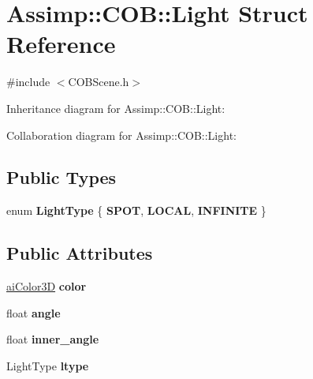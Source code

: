 \hypertarget{struct_assimp_1_1_c_o_b_1_1_light}{\section{Assimp\+:\+:C\+O\+B\+:\+:Light Struct Reference}
\label{struct_assimp_1_1_c_o_b_1_1_light}
}


{\ttfamily \#include $<$C\+O\+B\+Scene.\+h$>$}



Inheritance diagram for Assimp\+:\+:C\+O\+B\+:\+:Light\+:


Collaboration diagram for Assimp\+:\+:C\+O\+B\+:\+:Light\+:
\subsection*{Public Types}
\begin{DoxyCompactItemize}
\item 
\hypertarget{struct_assimp_1_1_c_o_b_1_1_light_a4486549bdc4bb81e6ff5bbef348e2f6e}{enum {\bfseries Light\+Type} \{ {\bfseries S\+P\+O\+T}, 
{\bfseries L\+O\+C\+A\+L}, 
{\bfseries I\+N\+F\+I\+N\+I\+T\+E}
 \}}\label{struct_assimp_1_1_c_o_b_1_1_light_a4486549bdc4bb81e6ff5bbef348e2f6e}

\end{DoxyCompactItemize}
\subsection*{Public Attributes}
\begin{DoxyCompactItemize}
\item 
\hypertarget{struct_assimp_1_1_c_o_b_1_1_light_a341e984619f2dc39d75cb905d27fb1d6}{\hyperlink{structai_color3_d}{ai\+Color3\+D} {\bfseries color}}\label{struct_assimp_1_1_c_o_b_1_1_light_a341e984619f2dc39d75cb905d27fb1d6}

\item 
\hypertarget{struct_assimp_1_1_c_o_b_1_1_light_a2620e541b4f66805fca5880d8112a48f}{float {\bfseries angle}}\label{struct_assimp_1_1_c_o_b_1_1_light_a2620e541b4f66805fca5880d8112a48f}

\item 
\hypertarget{struct_assimp_1_1_c_o_b_1_1_light_a94becb0717d57313ece4ee59c46e399c}{float {\bfseries inner\+\_\+angle}}\label{struct_assimp_1_1_c_o_b_1_1_light_a94becb0717d57313ece4ee59c46e399c}

\item 
\hypertarget{struct_assimp_1_1_c_o_b_1_1_light_aa4bada9785a408d46e1f53b31be9dbfc}{Light\+Type {\bfseries ltype}}\label{struct_assimp_1_1_c_o_b_1_1_light_aa4bada9785a408d46e1f53b31be9dbfc}

\end{DoxyCompactItemize}

